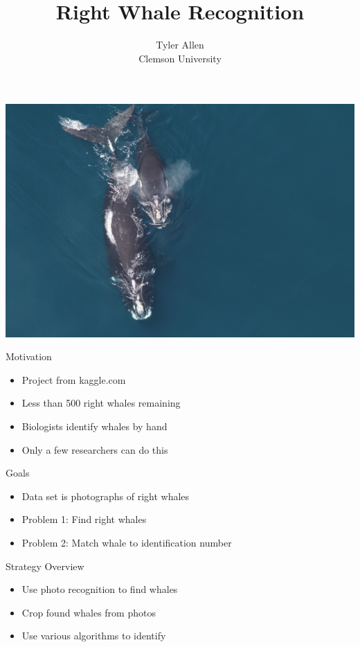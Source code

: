 \documentclass{beamer}
\title[]{Right Whale Recognition}
\author[]{Tyler Allen\\ \footnotesize Clemson University}
\date{\vspace{-10ex}}
\begin{document}
\begin{frame}
\begin{center}
\maketitle
\includegraphics[scale=.20]{title.png}
\end{center}
\end{frame}

\begin{frame}{Motivation}
\begin{itemize}
\item Project from kaggle.com
\item Less than 500 right whales remaining
\item Biologists identify whales by hand
\item Only a few researchers can do this
\end{itemize}
\end{frame}


\begin{frame}{Goals}
\begin{itemize}
\item Data set is photographs of right whales
\item Problem 1: Find right whales
\item Problem 2: Match whale to identification number
\end{itemize}
\end{frame}

\begin{frame}{Strategy Overview}
\begin{itemize}
\item Use photo recognition to find whales
\item Crop found whales from photos
\item Use various algorithms to identify
\end{itemize}
\end{frame}
\end{document}
